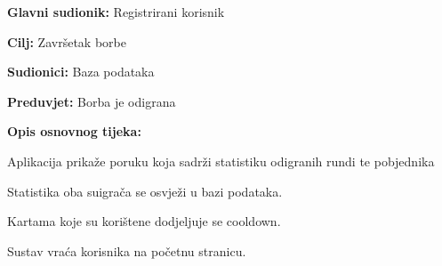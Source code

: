				\noindent {}
				\begin{packed_item}
					
					\item \textbf{Glavni sudionik: }Registrirani korisnik
					\item  \textbf{Cilj:} Završetak borbe
					\item  \textbf{Sudionici:} Baza podataka
					\item  \textbf{Preduvjet:} Borba je odigrana
					\item  \textbf{Opis osnovnog tijeka:}
					
					\item[] \begin{packed_enum}
						
						\item Aplikacija prikaže poruku koja sadrži statistiku odigranih rundi te pobjednika
						\item Statistika oba suigrača se osvježi u bazi podataka.
						\item Kartama koje su korištene dodjeljuje se cooldown.
						\item Sustav vraća korisnika na početnu stranicu.
					\end{packed_enum}
				\end{packed_item}
				
